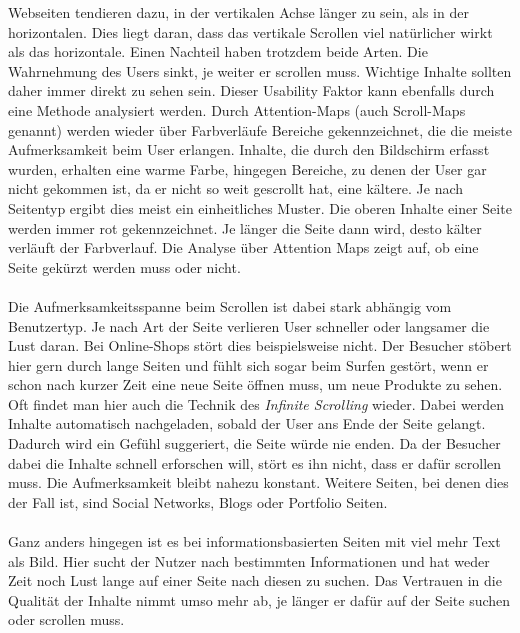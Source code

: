 Webseiten tendieren dazu, in der vertikalen Achse länger zu sein, als in der horizontalen. Dies liegt daran, dass das vertikale Scrollen viel natürlicher wirkt als das horizontale. Einen Nachteil haben trotzdem beide Arten. Die Wahrnehmung des Users sinkt, je weiter er scrollen muss. Wichtige Inhalte sollten daher immer direkt zu sehen sein. Dieser Usability Faktor kann ebenfalls durch eine Methode analysiert werden. Durch Attention-Maps (auch Scroll-Maps genannt) werden wieder über Farbverläufe Bereiche gekennzeichnet, die die meiste Aufmerksamkeit beim User erlangen. Inhalte, die durch den Bildschirm erfasst wurden, erhalten eine warme Farbe, hingegen Bereiche, zu denen der User gar nicht gekommen ist, da er nicht so weit gescrollt hat, eine kältere. Je nach Seitentyp ergibt dies meist ein einheitliches Muster. Die oberen Inhalte einer Seite werden immer rot gekennzeichnet. Je länger die Seite dann wird, desto kälter verläuft der Farbverlauf. Die Analyse über Attention Maps zeigt auf, ob eine Seite gekürzt werden muss oder nicht.\\
\\
Die Aufmerksamkeitsspanne beim Scrollen ist dabei stark abhängig vom Benutzertyp. Je nach Art der Seite verlieren User schneller oder langsamer die Lust daran. Bei Online-Shops stört dies beispielsweise nicht. Der Besucher stöbert hier gern durch lange Seiten und fühlt sich sogar beim Surfen gestört, wenn er schon nach kurzer Zeit eine neue Seite öffnen muss, um neue Produkte zu sehen. Oft findet man hier auch die Technik des \textit{Infinite Scrolling} wieder. Dabei werden Inhalte automatisch nachgeladen, sobald der User ans Ende der Seite gelangt. Dadurch wird ein Gefühl suggeriert, die Seite würde nie enden. Da der Besucher dabei die Inhalte schnell erforschen will, stört es ihn nicht, dass er dafür scrollen muss. Die Aufmerksamkeit bleibt nahezu konstant. Weitere Seiten, bei denen dies der Fall ist, sind Social Networks, Blogs oder Portfolio Seiten.\\
\\
Ganz anders hingegen ist es bei informationsbasierten Seiten mit viel mehr Text als Bild. Hier sucht der Nutzer nach bestimmten Informationen und hat weder Zeit noch Lust lange auf einer Seite nach diesen zu suchen. Das Vertrauen in die Qualität der Inhalte nimmt umso mehr ab, je länger er dafür auf der Seite suchen oder scrollen muss.